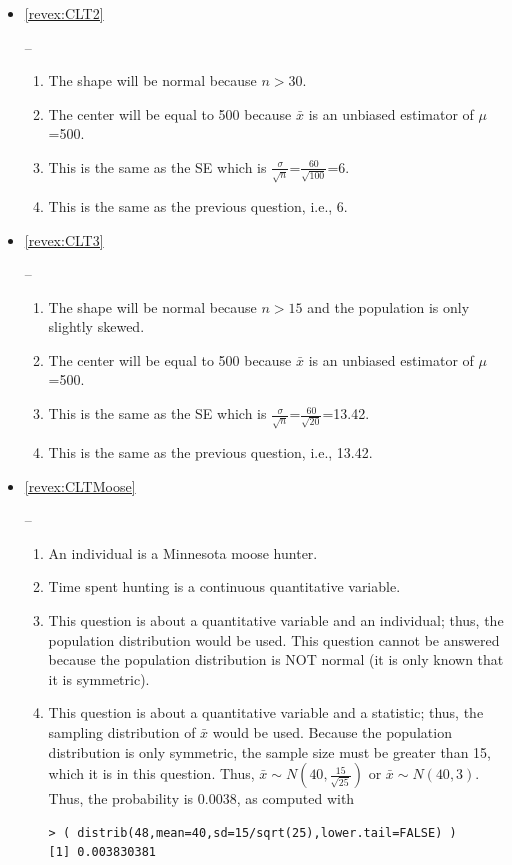 \documentclass[10pt,openany]{book}\usepackage[]{graphicx}\usepackage[]{color}
\makeatletter
\newenvironment{kframe}{%
 \def\at@end@of@kframe{}%
 \ifinner\ifhmode%
  \def\at@end@of@kframe{\end{minipage}}%
  \begin{minipage}{\columnwidth}%
 \fi\fi%
 \def\FrameCommand##1{\hskip\@totalleftmargin \hskip-\fboxsep
 \colorbox{shadecolor}{##1}\hskip-\fboxsep
     \hskip-\linewidth \hskip-\@totalleftmargin \hskip\columnwidth}%
 \MakeFramed {\advance\hsize-\width
   \@totalleftmargin\z@ \linewidth\hsize
   \@setminipage}}%
 {\par\unskip\endMakeFramed%
 \at@end@of@kframe}
\newenvironment{knitrout}{}{} %
\makeatother
\begin{document}
\begin{itemize}
    \item \hypertarget{ans:CLT2}{\ref{revex:CLT2}} --
    \begin{enumerate}
      \item The shape will be normal because $n>30$.
      \item The center will be equal to 500 because $\bar{x}$ is an unbiased estimator of $\mu$=500.
      \item This is the same as the SE which is $\frac{\sigma}{\sqrt{n}}$=$\frac{60}{\sqrt{100}}$=6.
      \item This is the same as the previous question, i.e., 6.
    \end{enumerate}
  \item \hypertarget{ans:CLT3}{\ref{revex:CLT3}} --
  \begin{enumerate}
    \item The shape will be normal because $n>15$ and the population is only slightly skewed.
    \item The center will be equal to 500 because $\bar{x}$ is an unbiased estimator of $\mu$=500.
    \item This is the same as the SE which is $\frac{\sigma}{\sqrt{n}}$=$\frac{60}{\sqrt{20}}$=13.42.
    \item This is the same as the previous question, i.e., 13.42.
  \end{enumerate}
    \item \hypertarget{ans:CLTMoose}{\ref{revex:CLTMoose}} --
    \begin{enumerate}
      \item An individual is a Minnesota moose hunter.
      \item Time spent hunting is a continuous quantitative variable.
      \item This question is about a quantitative variable and an individual; thus, the population distribution would be used.  This question cannot be answered because the population distribution is NOT normal (it is only known that it is symmetric).
      \item This question is about a quantitative variable and a statistic; thus, the sampling distribution of $\bar{x}$ would be used.  Because the population distribution is only symmetric, the sample size must be greater than 15, which it is in this question.  Thus, $\bar{x}\sim N(40,\frac{15}{\sqrt{25}})$ or $\bar{x}\sim N(40,3)$.  Thus, the probability is 0.0038, as computed with
\begin{knitrout}
\color{fgcolor}\begin{kframe}
\begin{verbatim}
> ( distrib(48,mean=40,sd=15/sqrt(25),lower.tail=FALSE) )
[1] 0.003830381
\end{verbatim}
\end{kframe}


\end{knitrout}
\end{enumerate}
\end{itemize}
\end{document}
